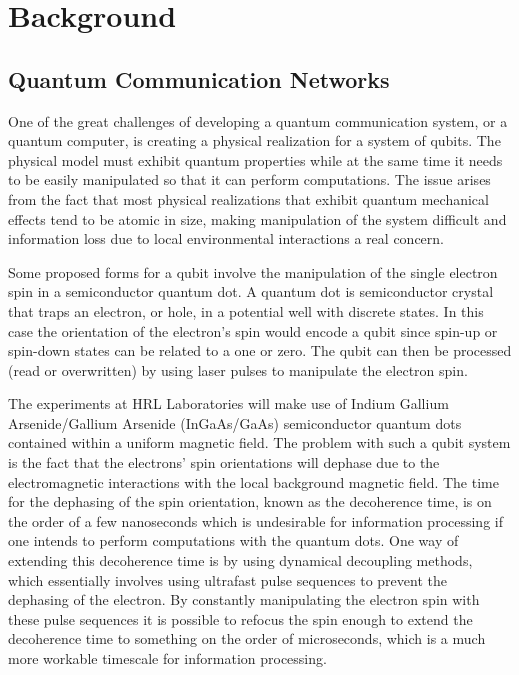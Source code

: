 \documentclass[pdftex,12pt,a4paper]{article}
\begin{document}
\section{Background}
\subsection{Quantum Communication Networks} 

One of the great challenges of developing a quantum communication system, or a quantum computer, is creating a physical realization for a system of qubits. The physical model must exhibit quantum properties while at the same time it needs to be easily manipulated so that it can perform computations. The issue arises from the fact that most physical realizations that exhibit quantum mechanical effects tend to be atomic in size, making manipulation of the system difficult and information loss due to local environmental interactions a real concern. 

Some proposed forms for a qubit involve the manipulation of the single electron spin in a semiconductor quantum dot. A quantum dot is semiconductor crystal that traps an electron, or hole, in a potential well with discrete states. In this case the orientation of the electron’s spin would encode a qubit since spin-up or spin-down states can be related to a one or zero. The qubit can then be processed (read or overwritten) by using laser pulses to manipulate the electron spin.

The experiments at HRL Laboratories will make use of Indium Gallium Arsenide/Gallium Arsenide (InGaAs/GaAs) semiconductor quantum dots contained within a uniform magnetic field. The problem with such a qubit system is the fact that the electrons’ spin orientations will dephase due to the electromagnetic interactions with the local background magnetic field. The time for the dephasing of the spin orientation, known as the decoherence time, is on the order of a few nanoseconds which is undesirable for information processing if one intends to perform computations with the quantum dots. One way of extending this decoherence time is by using dynamical decoupling methods, which essentially involves using ultrafast pulse sequences to prevent the dephasing of the electron. By constantly manipulating the electron spin with these pulse sequences it is possible to refocus the spin enough to extend the decoherence time to something on the order of microseconds, which is a much more workable timescale for information processing\cite{Nuclear_Feedback}.
\end{document}
